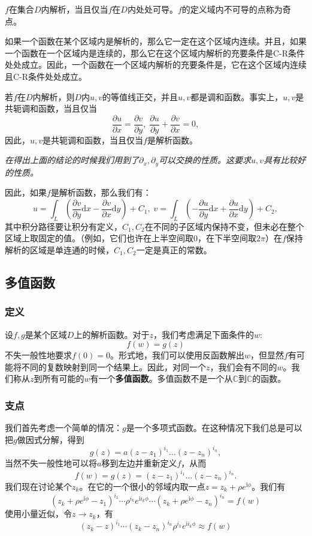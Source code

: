 \documentclass[UTF8]{ctexart}
\begin{document}
$f$在集合$D$内解析，当且仅当$f$在$D$内处处可导。$f$的定义域内不可导的点称为奇点。

如果一个函数在某个区域内是解析的，那么它一定在这个区域内连续。并且，如果一个函数在一个区域内是连续的，那么它在这个区域内解析的充要条件是C-R条件处处成立。因此，一个函数在一个区域内解析的充要条件是，它在这个区域内连续且C-R条件处处成立。

若$f$在$D$内解析，则$D$内$u,v$的等值线正交，并且$u, v$都是调和函数。事实上，$u, v$是共轭调和函数，当且仅当
\[
\frac{\partial u}{\partial x} = \frac{\partial v}{\partial y}, \; \frac{\partial u}{\partial y} + \frac{\partial v}{\partial x} = 0,
\] 因此，$u, v$是共轭调和函数，当且仅当$f$是解析函数。

\emph{在得出上面的结论的时候我们用到了$\partial_x, \partial_y$可以交换的性质。这要求$u, v$具有比较好的性质。}

因此，如果$f$是解析函数，那么我们有： \[
u = \int_L (\frac{\partial v}{\partial y} \mathrm{d}x - \frac{\partial v}{\partial x} \mathrm{d}y) + C_1, \; 
v = \int_L (-\frac{\partial u}{\partial y}\mathrm{d}x + \frac{\partial u}{\partial x} \mathrm{d}y) + C_2,
\]
其中积分路径要让积分有定义，$C_1, C_2$在不同的子区域内保持不变，但未必在整个区域上取固定的值。（例如，它们也许在上半空间取0，在下半空间取$2\pi$）在$f$保持解析的区域是单连通的时候，$C_1, C_2$一定是真正的常数。

\hypertarget{ux591aux503cux51fdux6570}{%
\subsection{多值函数}\label{ux591aux503cux51fdux6570}}

\hypertarget{ux5b9aux4e49}{%
\subsubsection{定义}\label{ux5b9aux4e49}}

设$f, g$是某个区域$D$上的解析函数。对于$z$，我们考虑满足下面条件的$w$:
\[
f(w) = g(z)
\]
不失一般性地要求$f(0)=0$。形式地，我们可以使用反函数解出$w$，但显然$f$有可能将不同的复数映射到同一个结果上。因此，对同一个$z$，我们会有不同的$w$。我们称从$z$到所有可能的$w$有一个\textbf{多值函数}。多值函数不是一个从$\mathbb{C}$到$\mathbb{C}$的函数。

\subsubsection{支点}

我们首先考虑一个简单的情况：$g$是一个多项式函数。在这种情况下我们总是可以把$g$做因式分解，得到
\[
g(z) = a (z - z_1)^{i_1} \ldots (z - z_n)^{i_n},
\] 当然不失一般性地可以将$a$移到左边并重新定义$f$，从而 \[
f(w) = g(z) = (z - z_1)^{i_1} \ldots (z - z_n)^{i_n}.
\]
我们现在讨论某个$z_k$。在它的一个很小的邻域内取一点$z=z_k + \rho e^{\mathrm{i}\phi}$。我们有
\[
(z_k + \rho e^{\mathrm{i}\phi} - z_1)^{i_1} \cdots \rho^{i_k} e^{\mathrm{i}i_k \phi} \cdots (z_k + \rho e^{\mathrm{i}\phi} - z_n)^{i_n} = f(w)
\] 使用小量近似，令$z \rightarrow z_k$，有 \[
(z_k - z)^{i_1} \cdots (z_k - z_n)^{i_n} \rho^{i_k} e^{\mathrm{i} i_k \phi} \approx f(w)
\]
\end{document}
